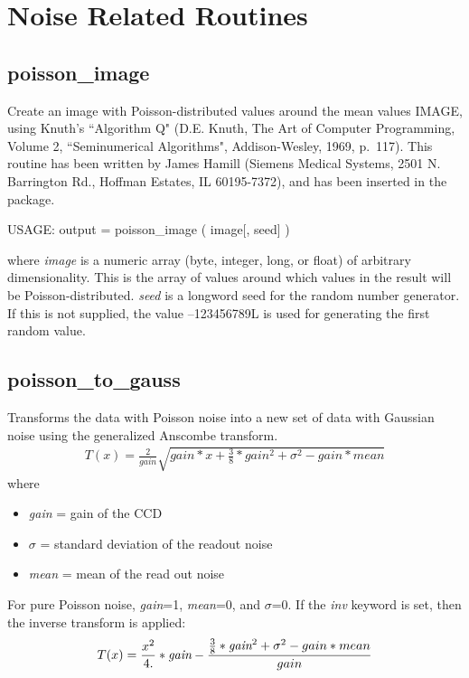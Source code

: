 \section{Noise Related Routines}
\subsection{poisson\_image}
Create an image with Poisson-distributed values around the mean values
IMAGE, using Knuth's ``Algorithm Q"  (D.E. Knuth, The Art of
Computer Programming, Volume 2, ``Seminumerical Algorithms", 
Addison-Wesley, 1969, p.\ 117). This routine has been written by James Hamill
(Siemens Medical Systems, 2501 N. Barrington Rd., Hoffman Estates, IL  
60195-7372), and has been inserted in the \proj package.
{\bf
\begin{center}
     USAGE: output = poisson\_image ( image[, seed] )
\end{center}}
where {\em image} is a  numeric array (byte, integer, long, or float) of arbitrary dimensionality.  
This is the array of values around which values in the
result will be Poisson-distributed. {\em seed} is a  longword seed for the random number generator.  If this is not
supplied, the value --123456789L is used for generating the first random
value. 

\subsection{poisson\_to\_gauss}
Transforms the data with Poisson noise into a new set of data
 with Gaussian noise using the generalized Anscombe transform.
\begin{eqnarray}
T(x) = \frac{2}{gain} \sqrt{gain*x + \frac{3}{8}*gain^2 + \sigma^2 - gain * mean}
\end{eqnarray}
where
\begin{itemize}
\item {\em gain} = gain of the CCD
\item $\sigma$ = standard deviation of the readout noise
\item {\em mean} = mean of the read out noise
\end{itemize}
For pure Poisson noise, {\em gain}=1, {\em mean}=0, and $\sigma$=0.
If the {\em inv} keyword is set, then the inverse transform is applied:
\begin{eqnarray}
 T(x) = \frac{x^2}{4.} * \textrm{\em gain} - \frac{\frac{3}{8}*\textrm{\em gain}^2 + \sigma^2 - gain * mean}{gain}
\end{eqnarray}


